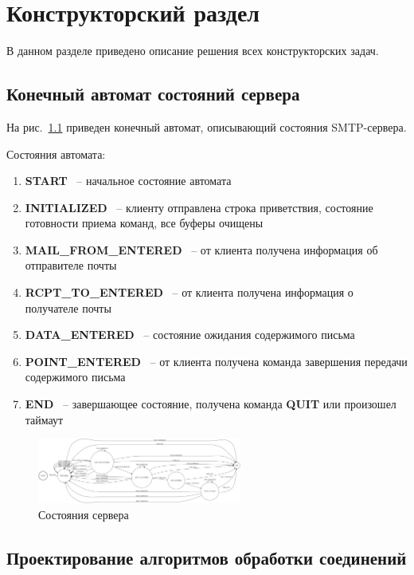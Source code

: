 \chapter{Конструкторский раздел}
В данном разделе приведено описание решения всех конструкторских задач.

\section{Конечный автомат состояний сервера}

На рис.~\ref{fig:fsm} приведен конечный автомат, описывающий состояния SMTP-сервера. 

Состояния автомата:

\begin{enumerate}
\item \textbf{START} ~-- начальное состояние автомата
\item \textbf{INITIALIZED} ~--  клиенту отправлена строка приветствия, состояние готовности приема команд, все буферы очищены
\item \textbf{MAIL\_FROM\_ENTERED} ~-- от клиента получена информация об отправителе почты
\item \textbf{RCPT\_TO\_ENTERED} ~-- от клиента получена информация о получателе почты
\item \textbf{DATA\_ENTERED} ~-- состояние ожидания содержимого письма
\item \textbf{POINT\_ENTERED} ~-- от клиента получена команда завершения передачи содержимого письма
\item \textbf{END} ~-- завершающее состояние, получена команда \textbf{QUIT} или произошел таймаут
\end{enumerate}



\begin{figure}
\centering
\includegraphics[angle=90,width=0.6\textwidth]{smtp.png}
\caption{Состояния сервера}
\label{fig:fsm}
\end{figure}


\section{Проектирование алгоритмов обработки соединений}

